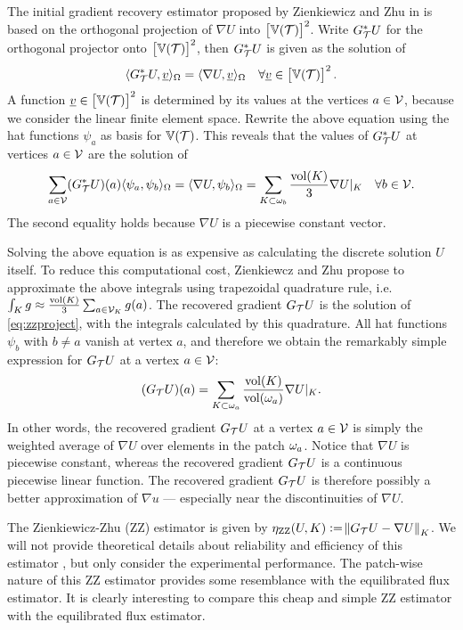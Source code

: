 \documentclass[thesis.tex]{subfiles}
\begin{document}
The initial gradient recovery estimator proposed by Zienkiewicz and Zhu in \cite{zienkiewicz1987simple} is based on
the orthogonal projection of $\nabla U$ into $\left[\mathbb{V}(\mathcal{T})\right]^2$. Write $G_{\mathcal{T}}^*U$ for the orthogonal
projector onto $\left[\mathbb{V}(\mathcal{T})\right]^2$, then $G_{\mathcal{T}}^*U$ is given as the solution of
\[
  \langle G_{\mathcal{T}}^*U, \underline{v}  \rangle_\Omega = \langle \nabla U,\underline{v} \rangle_\Omega \quad \forall \underline{v} \in \left[\mathbb{V}(\mathcal{T})\right]^2.
\]
A function $\underline{v} \in \left[\mathbb{V}(\mathcal{T})\right]^2$ is determined by its values at the vertices $a \in \mathcal{V}$,
because we consider the linear finite element space. Rewrite the above equation using the hat functions $\psi_a$ as basis for $\mathbb{V}(\mathcal{T})$.
This reveals that the values of $G_{\mathcal{T}}^*U$ at vertices $a \in \mathcal{V}$  are the solution of 
\begin{equation}
  \label{eq:zzproject}
  \sum_{a \in \mathcal{V}} (G_{\mathcal{T}}^* U)(a) \langle \psi_a, \psi_b \rangle_\Omega = \langle \nabla U, \psi_b \rangle_{\Omega} = \sum_{K \subset \omega_b} \frac{\operatorname{vol}(K)}{3} \nabla U|_K \quad \forall b \in \mathcal{V}.
\end{equation}
The second equality holds because $\nabla U$ is a piecewise constant vector.

Solving the above equation is as expensive as calculating the discrete solution $U$ itself. To
reduce this computational cost, Zienkiewcz and Zhu \cite{zienkiewicz1987simple} propose to approximate the
above integrals using trapezoidal quadrature rule, i.e.~$\int_K g \approx \frac{\operatorname{vol}(K)}{3} \sum_{a \in \mathcal{V}_K} g(a)$. 
The recovered gradient $G_{\mathcal{T}} U$ is the solution of \eqref{eq:zzproject}, with the integrals calculated by this quadrature.
All hat functions $\psi_b$ with $b\ne a$ vanish at vertex $a$, and therefore we obtain the remarkably simple expression
for $G_{\mathcal{T}} U$ at a vertex $a \in \mathcal{V}$:
\[
  (G_{\mathcal{T}} U)(a) = \sum_{K \subset \omega_a} \frac{\operatorname{vol}(K)}{\operatorname{vol}(\omega_a)} \nabla U|_K.
\]
In other words, the recovered gradient $G_{\mathcal{T}} U$ at a vertex $a \in \mathcal{V}$ is simply the weighted average of $\nabla U$ over
elements in the patch $\omega_a$. Notice that $\nabla U$ is piecewise constant, whereas
the recovered gradient $G_{\mathcal{T}} U$ is a continuous piecewise linear function. The recovered gradient $G_{\mathcal{T}} U$ is 
therefore possibly a better approximation of $\nabla u$ --- especially near the discontinuities of $\nabla U$.

The Zienkiewicz-Zhu (ZZ) estimator is given by ${\eta_\text{ZZ}(U, K) := \norm{G_{\mathcal{T}} U - \nabla U}_K}$. We will
not provide theoretical details about reliability and efficiency of this estimator
\cite{rodriguez1994some,zienkiewicz1992superconvergent}, but only consider
the experimental performance. The patch-wise nature of this ZZ estimator provides
some resemblance with the equilibrated flux estimator.
It is clearly interesting to compare this cheap and simple ZZ estimator with the equilibrated flux estimator.
\end{document}
